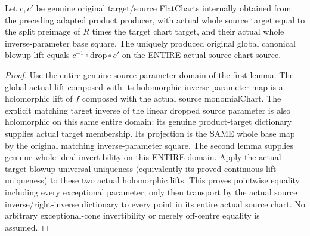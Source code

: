 \begin{theorem}
\label{hir:submersion-global-lift-whole-chart-equality}
\leanok
{}
Let $c,c'$ be genuine original target/source FlatCharts internally obtained from the preceding adapted product producer, with actual whole source target equal to the split preimage of $R$ times the target chart target, and their actual whole inverse-parameter base square. The uniquely produced original global canonical blowup lift equals $c^{-1}\circ\mathrm{drop}\circ c'$ on the ENTIRE actual source chart source.
\end{theorem}
\begin{proof}
Use the entire genuine source parameter domain of the first lemma. The global actual lift composed with its holomorphic inverse parameter map is a holomorphic lift of $f$ composed with the actual source monomialChart. The explicit matching target inverse of the linear dropped source parameter is also holomorphic on this same entire domain: its genuine product-target dictionary supplies actual target membership. Its projection is the SAME whole base map by the original matching inverse-parameter square. The second lemma supplies genuine whole-ideal invertibility on this ENTIRE domain. Apply the actual target blowup universal uniqueness (equivalently its proved continuous lift uniqueness) to these two actual holomorphic lifts. This proves pointwise equality including every exceptional parameter; only then transport by the actual source inverse/right-inverse dictionary to every point in its entire actual source chart. No arbitrary exceptional-cone invertibility or merely off-centre equality is assumed.
\end{proof}

